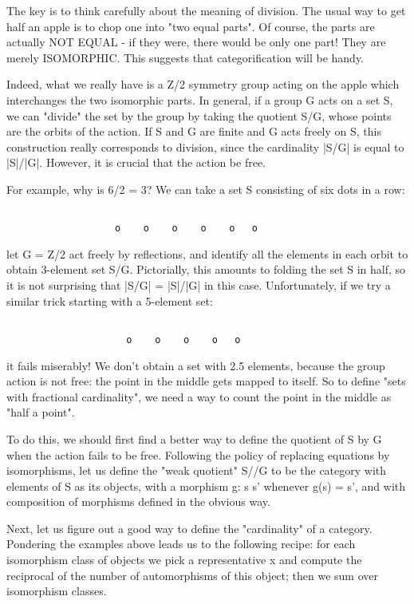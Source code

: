 The key is to think carefully about the meaning of division.  The 
usual way to get half an apple is to chop one into "two equal parts".
Of course, the parts are actually NOT EQUAL - if they were, there 
would be only one part!  They are merely ISOMORPHIC.  This suggests
that categorification will be handy.  

Indeed, what we really have is a Z/2 symmetry group acting on the 
apple which interchanges the two isomorphic parts.  In general, if a
group G acts on a set S, we can "divide" the set by the group by
taking the quotient S/G, whose points are the orbits of the action.  
If S and G are finite and G acts freely on S, this construction
really corresponds to division, since the cardinality |S/G| is
equal to |S|/|G|.   However, it is crucial that the action be free.

For example, why is 6/2 = 3?  We can take a set S consisting of six
dots in a row:


\begin{verbatim}

                   o    o    o    o    o   o
\end{verbatim}
    
let G = Z/2 act freely by reflections, and identify all the elements in 
each orbit to obtain 3-element set S/G.   Pictorially, this amounts to 
folding the set S in half, so it is not surprising that |S/G| = |S|/|G| 
in this case.  Unfortunately, if we try a similar trick starting with a 
5-element set:


\begin{verbatim}

                     o    o    o    o   o
\end{verbatim}
    
it fails miserably!  We don't obtain a set with 2.5 elements, because 
the group action is not free: the point in the middle gets mapped to 
itself.   So to define "sets with fractional cardinality", we need a 
way to count the point in the middle as "half a point".

To do this, we should first find a better way to define the quotient of
S by G when the action fails to be free.  Following the policy of
replacing equations by isomorphisms, let us define the "weak
quotient" S//G to be the category with elements of S as its
objects, with a morphism g: s \to  s' whenever g(s) = s', and with
composition of morphisms defined in the obvious way.

Next, let us figure out a good way to define the "cardinality" of a
category.   Pondering the examples above leads us to the following 
recipe: for each isomorphism class of objects we pick a representative x 
and compute the reciprocal of the number of automorphisms of this object;
then we sum over isomorphism classes. 

